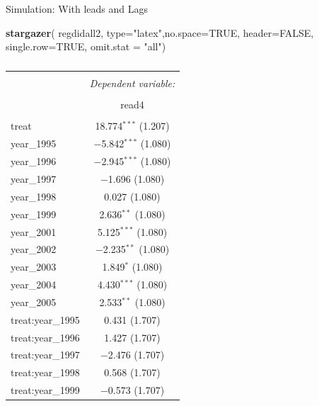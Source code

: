 \documentclass[
  ignorenonframetext,
]{beamer}
\newenvironment{Shaded}{\begin{snugshade}}{\end{snugshade}}
\newcommand{\DataTypeTok}[1]{\textcolor[rgb]{0.13,0.29,0.53}{#1}}
\newcommand{\KeywordTok}[1]{\textcolor[rgb]{0.13,0.29,0.53}{\textbf{#1}}}
\newcommand{\NormalTok}[1]{#1}
\newcommand{\OtherTok}[1]{\textcolor[rgb]{0.56,0.35,0.01}{#1}}
\newcommand{\StringTok}[1]{\textcolor[rgb]{0.31,0.60,0.02}{#1}}
\begin{document}
\begin{frame}[fragile]{Simulation: With leads and Lags}
\protect\hypertarget{simulation-with-leads-and-lags-3}{}
\tiny

\begin{Shaded}
\begin{Highlighting}[]
\KeywordTok{stargazer}\NormalTok{( regdidall2, }\DataTypeTok{type=}\StringTok{"latex"}\NormalTok{,}\DataTypeTok{no.space=}\OtherTok{TRUE}\NormalTok{, }\DataTypeTok{header=}\OtherTok{FALSE}\NormalTok{, }\DataTypeTok{single.row=}\OtherTok{TRUE}\NormalTok{, }\DataTypeTok{omit.stat =} \StringTok{"all"}\NormalTok{)}
\end{Highlighting}
\end{Shaded}

\begin{table}[!htbp] \centering 
  \caption{} 
  \label{} 
\begin{tabular}{@{\extracolsep{5pt}}lc} 
\\[-1.8ex]\hline 
\hline \\[-1.8ex] 
 & \multicolumn{1}{c}{\textit{Dependent variable:}} \\ 
\cline{2-2} 
\\[-1.8ex] & read4 \\ 
\hline \\[-1.8ex] 
 treat & 18.774$^{***}$ (1.207) \\ 
  year\_1995 & $-$5.842$^{***}$ (1.080) \\ 
  year\_1996 & $-$2.945$^{***}$ (1.080) \\ 
  year\_1997 & $-$1.696 (1.080) \\ 
  year\_1998 & 0.027 (1.080) \\ 
  year\_1999 & 2.636$^{**}$ (1.080) \\ 
  year\_2001 & 5.125$^{***}$ (1.080) \\ 
  year\_2002 & $-$2.235$^{**}$ (1.080) \\ 
  year\_2003 & 1.849$^{*}$ (1.080) \\ 
  year\_2004 & 4.430$^{***}$ (1.080) \\ 
  year\_2005 & 2.533$^{**}$ (1.080) \\ 
  treat:year\_1995 & 0.431 (1.707) \\ 
  treat:year\_1996 & 1.427 (1.707) \\ 
  treat:year\_1997 & $-$2.476 (1.707) \\ 
  treat:year\_1998 & 0.568 (1.707) \\ 
  treat:year\_1999 & $-$0.573 (1.707) \\ 

\end{tabular}
\end{table}
\end{frame}
\end{document}
